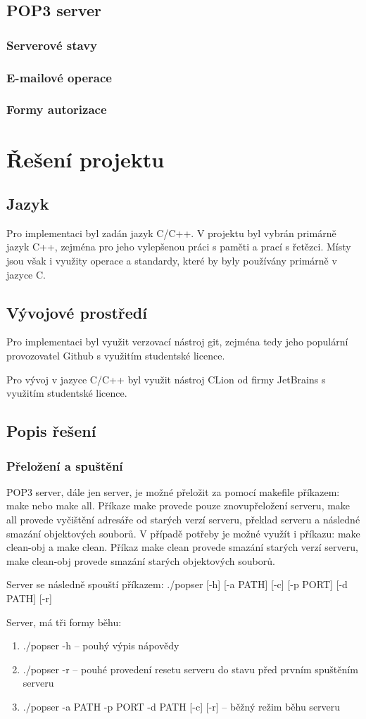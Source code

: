 \documentclass[11pt,a4paper]{report}
\begin{document}
\subsection{POP3 server}
\subsubsection{Serverové stavy}
\subsubsection{E-mailové operace}
\subsubsection{Formy autorizace}
\section{Řešení projektu}
\subsection{Jazyk}
Pro implementaci byl zadán jazyk C/C++. V projektu byl vybrán primárně jazyk C++, zejména pro jeho vylepšenou práci s paměti a prací s řetězci. Místy jsou však i využity operace a standardy, které by byly používány primárně v jazyce C.
\subsection{Vývojové prostředí}
Pro implementaci byl využit verzovací nástroj git, zejména tedy jeho populární provozovatel Github s využitím studentské licence.\par
Pro vývoj v jazyce C/C++ byl využit nástroj CLion od firmy JetBrains s využitím studentské licence.
\subsection{Popis řešení}
\subsubsection{Přeložení a spuštění}
POP3 server, dále jen server, je možné přeložit za pomocí makefile příkazem: make nebo make all. Příkaze make provede pouze znovupřeložení serveru, make all provede vyčištění adresáře od starých verzí serveru, překlad serveru a následné smazání objektových souborů.
V případě potřeby je možné využít i příkazu: make clean-obj a make clean. Příkaz make clean provede smazání starých verzí serveru, make clean-obj provede smazání starých objektových souborů.\par
Server se následně spouští příkazem: ./popser [-h] [-a PATH] [-c] [-p PORT] [-d PATH] [-r]\par
Server, má tři formy běhu:
\begin{enumerate}
\item ./popser -h -- pouhý výpis nápovědy
\item ./popser -r -- pouhé provedení resetu serveru do stavu před prvním spuštěním serveru
\item ./popser -a PATH -p PORT -d PATH [-c] [-r] -- běžný režim běhu serveru
\end{enumerate}
\end{document}
